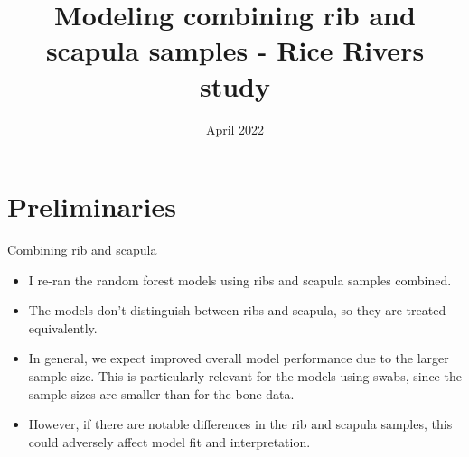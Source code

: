 \documentclass{beamer}
\title[]{Modeling combining rib and scapula samples - Rice Rivers study}
\date{April 2022}
\begin{document}
\begin{frame}
   \titlepage
\end{frame}









\section{Preliminaries}

\begin{frame}{Combining rib and scapula}

  \begin{itemize}
    \item I re-ran the random forest models using ribs and scapula samples combined.
    \item The models don't distinguish between ribs and scapula, so they are
    treated equivalently.
    \item In general, we expect improved overall model performance due to the
    larger sample size.  This is particularly relevant for the models using
    swabs, since the sample sizes are smaller than for the bone data.
    \item However, if there are notable differences in the rib and scapula
    samples, this could adversely affect model fit and interpretation.
  \end{itemize}

\end{frame}
\end{document}
